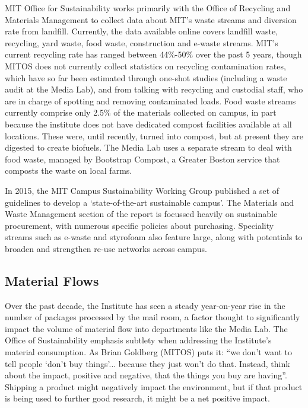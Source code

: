 \documentclass[nofonts,nols,justified,nobib]{tufte-book}
\begin{document}
MIT Office for Sustainability works primarily with the Office of Recycling and Materials Management to collect data about MIT's waste streams and diversion rate from landfill. Currently, the data available online covers landfill waste, recycling, yard waste, food waste, construction and e-waste streams. MIT's current recycling rate has ranged between 44\%-50\% over the past 5 years, though MITOS does not currently collect statistics on recycling contamination rates, which have so far been estimated through one-shot studies (including a waste audit at the Media Lab), and from talking with recycling and custodial staff, who are in charge of spotting and removing contaminated loads. Food waste streams currently comprise only 2.5\% of the materials collected on campus, in part because the institute does not have dedicated compost facilities available at all locations. These were, until recently, turned into compost, but at present they are digested to create biofuels. The Media Lab uses a separate stream to deal with food waste, managed by Bootstrap Compost, a Greater Boston service that composts the waste on local farms.

In 2015, the MIT Campus Sustainability Working Group published a set of guidelines to develop a `state-of-the-art sustainable campus'. The Materials and Waste Management section of the report is focussed heavily on sustainable procurement, with numerous specific policies about purchasing. Speciality streams such as e-waste and styrofoam also feature large, along with potentials to broaden and strengthen re-use networks across campus.

\subsection*{Material Flows}

Over the past decade, the Institute has seen a steady year-on-year rise in the number of packages processed by the mail room, a factor thought to significantly impact the volume of material flow into departments like the Media Lab. The Office of Sustainability emphasis subtlety when addressing the Institute's material consumption. As Brian Goldberg (MITOS) puts it: ``we don't want to tell people `don't buy things'... because they just won't do that. Instead, think about the impact, positive and negative, that the things you buy are having''. Shipping a product might negatively impact the environment, but if that product is being used to further good research, it might be a net positive impact.
\end{document}
